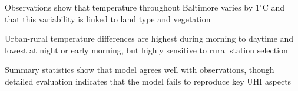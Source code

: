 \documentclass[draft,linenumbers]{agujournal}
\begin{document}





\begin{keypoints}
\item Observations show that temperature throughout Baltimore varies by 1$^\circ$C and that this variability is linked to land type and vegetation 
\item Urban-rural temperature differences are highest during morning to daytime and lowest at night or early morning, but highly sensitive to rural station selection
\item Summary statistics show that model agrees well with observations, though detailed evaluation indicates that the model fails to reproduce key UHI aspects
\end{keypoints}

%
%

\end{document}

